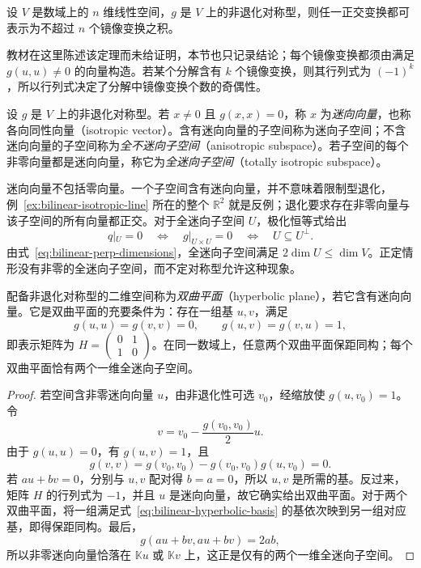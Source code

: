 \begin{theorem}
\label{thm:bilinear-cartan-dieudonne}
设 $V$ 是数域上的 $n$ 维线性空间，$g$ 是 $V$ 上的非退化对称型，则任一正交变换都可表示为不超过 $n$ 个镜像变换之积。
\end{theorem}

教材在这里陈述该定理而未给证明，本节也只记录结论；每个镜像变换都须由满足 $g(u,u)\neq0$ 的向量构造。若某个分解含有 $k$ 个镜像变换，则其行列式为 $(-1)^k$，所以行列式决定了分解中镜像变换个数的奇偶性。

\begin{definition}
\label{def:bilinear-isotropic}
设 $g$ 是 $V$ 上的非退化对称型。若 $x\neq0$ 且 $g(x,x)=0$，称 $x$ 为\emph{迷向向量}，也称各向同性向量（isotropic vector）。含有迷向向量的子空间称为迷向子空间；不含迷向向量的子空间称为\emph{全不迷向子空间}（anisotropic subspace）。若子空间的每个非零向量都是迷向向量，称它为\emph{全迷向子空间}（totally isotropic subspace）。
\end{definition}

迷向向量不包括零向量。一个子空间含有迷向向量，并不意味着限制型退化，例~\ref{ex:bilinear-isotropic-line} 所在的整个 $\mathbb R^2$ 就是反例；退化要求存在非零向量与该子空间的所有向量都正交。对于全迷向子空间 $U$，极化恒等式给出
\[
    q|_U=0\quad\Longleftrightarrow\quad g|_{U\times U}=0
    \quad\Longleftrightarrow\quad U\subseteq U^\perp.
\]
由式~\eqref{eq:bilinear-perp-dimensions}，全迷向子空间满足 $2\dim U\leq\dim V$。正定情形没有非零的全迷向子空间，而不定对称型允许这种现象。

\begin{theorem}
\label{thm:bilinear-hyperbolic-plane}
配备非退化对称型的二维空间称为\emph{双曲平面}（hyperbolic plane），若它含有迷向向量。它是双曲平面的充要条件为：存在一组基 $u,v$，满足
\begin{equation}
\label{eq:bilinear-hyperbolic-basis}
    g(u,u)=g(v,v)=0,\qquad g(u,v)=g(v,u)=1,
\end{equation}
即表示矩阵为 $H=\begin{pmatrix}0&1\\1&0\end{pmatrix}$。在同一数域上，任意两个双曲平面保距同构；每个双曲平面恰有两个一维全迷向子空间。
\end{theorem}

\begin{proof}
若空间含非零迷向向量 $u$，由非退化性可选 $v_0$，经缩放使 $g(u,v_0)=1$。令
\[
    v=v_0-\frac{g(v_0,v_0)}2u.
\]
由于 $g(u,u)=0$，有 $g(u,v)=1$，且
\[
    g(v,v)=g(v_0,v_0)-g(v_0,v_0)g(u,v_0)=0.
\]
若 $au+bv=0$，分别与 $u,v$ 配对得 $b=a=0$，所以 $u,v$ 是所需的基。反过来，矩阵 $H$ 的行列式为 $-1$，并且 $u$ 是迷向向量，故它确实给出双曲平面。对于两个双曲平面，将一组满足式~\eqref{eq:bilinear-hyperbolic-basis} 的基依次映到另一组对应基，即得保距同构。最后，
\[
    g(au+bv,au+bv)=2ab,
\]
所以非零迷向向量恰落在 $\mathbb K u$ 或 $\mathbb K v$ 上，这正是仅有的两个一维全迷向子空间。
\end{proof}

